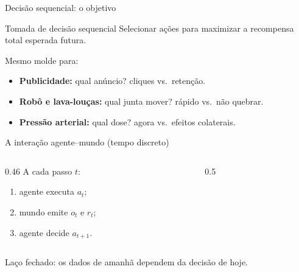 \documentclass[aspectratio=169, 11pt]{beamer}
\begin{document}
\begin{frame}{Decisão sequencial: o objetivo}
  \begin{defbox}{Tomada de decisão sequencial}
    Selecionar ações para \alert{maximizar a recompensa total esperada futura}.
  \end{defbox}

  Mesmo molde para:
  \begin{itemize}
    \item \textbf{Publicidade:} qual anúncio? cliques vs.\ retenção.
    \item \textbf{Robô e lava-louças:} qual junta mover? rápido vs.\ não quebrar.
    \item \textbf{Pressão arterial:} qual dose? agora vs.\ efeitos colaterais.
  \end{itemize}
\end{frame}

\begin{frame}{A interação agente–mundo (tempo discreto)}
  \begin{columns}[c]
    \begin{column}{0.46\textwidth}
      A cada passo $t$:
      \begin{enumerate}
        \item agente executa $a_t$;
        \item mundo emite $o_t$ e $r_t$;
        \item agente decide $a_{t+1}$.
      \end{enumerate}
    \end{column}
    \begin{column}{0.5\textwidth}
      \centering
    \end{column}
  \end{columns}

  \medskip
  \begin{ideiabox}
    Laço fechado: os dados de amanhã dependem da decisão de hoje.
  \end{ideiabox}
\end{frame}
\end{document}
